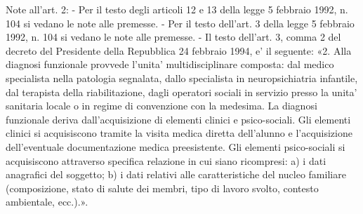     Note all'art. 2:
    - Per il testo degli articoli 12 e 13 della legge 5 febbraio 1992, n. 104 si vedano le note alle premesse.
    - Per il testo dell'art. 3 della legge 5 febbraio 1992, n. 104 si vedano le note alle premesse.
    - Il testo dell'art. 3, comma 2 del decreto del Presidente della Repubblica 24 febbraio 1994, e' il seguente: «2. Alla diagnosi funzionale provvede l'unita' multidisciplinare composta: dal medico specialista nella patologia segnalata, dallo specialista in neuropsichiatria infantile, dal terapista della riabilitazione, dagli operatori sociali in servizio presso la unita' sanitaria locale o in regime di convenzione con la medesima. La diagnosi funzionale deriva dall'acquisizione di elementi clinici e psico-sociali. Gli elementi clinici si acquisiscono tramite la visita medica diretta dell'alunno e l'acquisizione dell'eventuale documentazione medica preesistente. Gli elementi psico-sociali si acquisiscono attraverso specifica relazione in cui siano ricompresi: a) i dati anagrafici del soggetto; b) i dati relativi alle caratteristiche del nucleo familiare (composizione, stato di salute dei membri, tipo di lavoro svolto, contesto ambientale, ecc.).».

